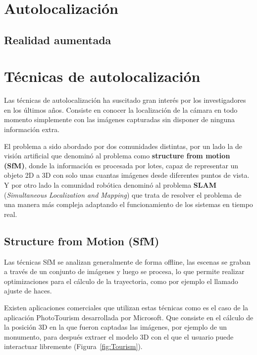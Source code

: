 \section{Autolocalización}


\subsection{Realidad aumentada}


\section{Técnicas de autolocalización}

Las técnicas de autolocalización ha suscitado gran interés por los investigadores en los últimos años. Consiste en conocer la localización de la cámara en todo momento simplemente con las imágenes capturadas sin disponer de ninguna información extra.

El problema a sido abordado por dos comunidades distintas, por un lado la de visión artificial que denominó al problema como \textbf{structure from motion (SfM)}, donde la información es procesada por lotes, capaz de representar un objeto 2D a 3D con solo unas cuantas imágenes desde diferentes puntos de vista. Y por otro lado la comunidad robótica denominó al problema \textbf{SLAM} (\textit{Simultaneous Localization and Mapping}) que trata de resolver el problema de una manera más compleja adaptando el funcionamiento de los sistemas en tiempo real.

\subsection{Structure from Motion (SfM)}

Las técnicas SfM se analizan generalmente de forma offline, las escenas se graban a través de un conjunto de imágenes y luego se procesa, lo que permite realizar optimizaciones para el cálculo de la trayectoria, como por ejemplo el llamado ajuste de haces.

Existen aplicaciones comerciales que utilizan estas técnicas como es el caso de la aplicación PhotoTourism \parencite{Reference2} desarrollada por Microsoft. Que consiste en el cálculo de la posición 3D en la que fueron captadas las imágenes, por ejemplo de un monumento, para después extraer el modelo 3D con el que el usuario puede interactuar libremente (Figura~\ref{fig:Tourism}).

